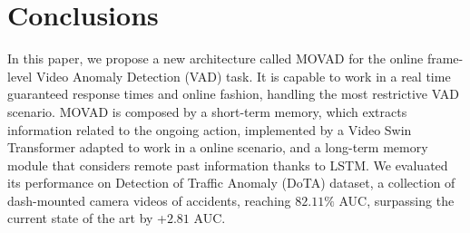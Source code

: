 \section{Conclusions}
\label{sec:conclusions}

In this paper, we propose a new architecture called MOVAD for the online frame-level Video Anomaly Detection (VAD) task.
It is capable to work in a real time guaranteed response times and online fashion, handling the most restrictive VAD scenario.
MOVAD is composed by a short-term memory, which extracts information related to the ongoing action, implemented by a Video Swin Transformer adapted to work in a online scenario, and a long-term memory module that considers remote past information thanks to LSTM.
We evaluated its performance on Detection of Traffic Anomaly (DoTA) dataset, a collection of dash-mounted camera videos of accidents, reaching $82.11\%$ AUC, surpassing the current state of the art by +$2.81$ AUC.